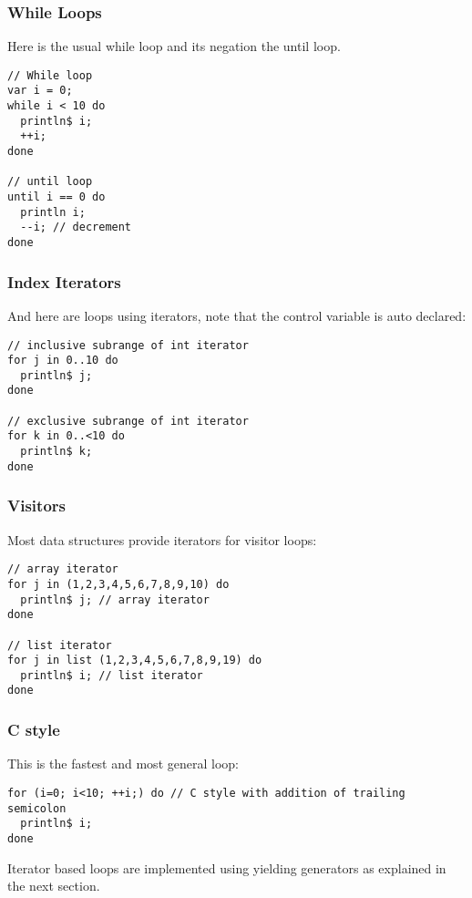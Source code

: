 \documentclass[oneside]{book}
\begin{document}
\subsubsection{While Loops}
Here is the usual while loop and its negation the until loop.

\begin{verbatim}
// While loop
var i = 0;
while i < 10 do
  println$ i;
  ++i; 
done

// until loop
until i == 0 do 
  println i;
  --i; // decrement
done
\end{verbatim}

\subsubsection{Index Iterators}
And here are loops using iterators, note that the
control variable is auto declared:

\begin{verbatim}
// inclusive subrange of int iterator
for j in 0..10 do 
  println$ j; 
done

// exclusive subrange of int iterator
for k in 0..<10 do 
  println$ k;
done
\end{verbatim}

\subsubsection{Visitors}
Most data structures provide iterators for
visitor loops:

\begin{verbatim}
// array iterator
for j in (1,2,3,4,5,6,7,8,9,10) do
  println$ j; // array iterator
done

// list iterator
for j in list (1,2,3,4,5,6,7,8,9,19) do
  println$ i; // list iterator
done
\end{verbatim}

\subsubsection{C style}
This is the fastest and most general loop:

\begin{verbatim}
for (i=0; i<10; ++i;) do // C style with addition of trailing semicolon
  println$ i;
done
\end{verbatim}

Iterator based loops are implemented using yielding generators
as explained in the next section.
\end{document}
